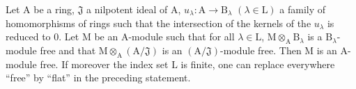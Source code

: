 \begin{theorem}[11.4.1]
\label{IV.11.4.1}
Let $\mathrm{A}$ be a ring, $\mathfrak{J}$ a nilpotent ideal of $\mathrm{A}$, $u_\lambda:\mathrm{A}\to\mathrm{B}_\lambda$ $(\lambda\in\mathrm{L})$
a family of homomorphisms of rings such that the intersection of the kernels of the $u_\lambda$ is reduced to $0$.
Let $\mathrm{M}$ be an $\mathrm{A}$-module such that for all $\lambda\in\mathrm{L}$, $\mathrm{M}\otimes_\mathrm{A}\mathrm{B}_\lambda$ is a $\mathrm{B}_\lambda$-module free and that $\mathrm{M}\otimes_\mathrm{A}(\mathrm{A}/\mathfrak{J})$
is an $(\mathrm{A}/\mathfrak{J})$-module free. Then $\mathrm{M}$ is an $\mathrm{A}$-module free. If moreover the index set $\mathrm{L}$ is
finite, one can replace everywhere ``free'' by ``flat'' in the preceding statement.
\end{theorem}


